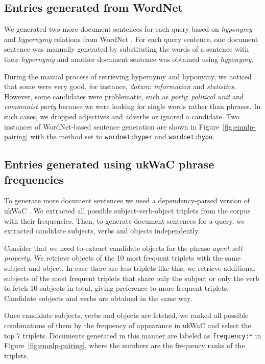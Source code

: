 \subsection{Entries generated from WordNet}
We generated two more document sentences for each query based on \emph{hyponymy} and \emph{hypernymy} relations from WordNet \cite{Miller:1995:WLD:219717.219748}. For each query sentence, one document sentence was manually generated by substituting the words of a sentence with their \emph{hypernymy} and another document sentence was obtained using \emph{hyponymy}.

During the manual process of retrieving hypernymy and hyponymy, we noticed that some were very good, for instance, \textit{datum}: \textit{information} and \textit{statistics}. However, some candidates were problematic, such as \textit{party}: \textit{political unit} and \textit{communist party} because we were looking for single words rather than phrases. In such cases, we dropped adjectives and adverbs or ignored a candidate. Two instances of WordNet-based sentence generation are shown in Figure~\ref{fig:emnlp-pairing} with the method set to \texttt{wordnet:hyper} and \texttt{wordnet:hypo}.

\subsection{Entries generated using ukWaC phrase frequencies}

To generate more document sentences we used a dependency-parsed version of ukWaC \cite{ukwac}. We extracted all possible subject-verb-object triplets from the corpus with their frequencies. Then, to generate document sentences for a query, we extracted candidate subjects, verbs and objects independently.

Consider that we need to extract candidate objects for the phrase \textit{agent sell property}. We retrieve objects of the 10 most frequent triplets with the same subject and object. In case there are less triplets like this, we retrieve additional subjects of the most frequent triplets that share only the subject or only the verb to fetch 10 subjects in total, giving preference to more frequent triplets. Candidate subjects and verbs are obtained in the same way.

Once candidate subjects, verbs and objects are fetched, we ranked all possible combinations of them by the frequency of appearance in ukWaC and select the top 7 triplets. Documents generated in this manner are labeled as \texttt{frequency:*} in Figure~\ref{fig:emnlp-pairing}, where the numbers are the frequency ranks of the triplets.


